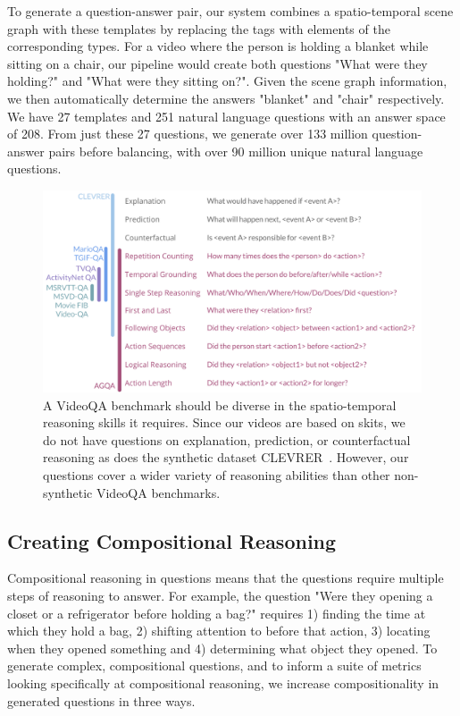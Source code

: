 \documentclass[10pt,twocolumn,letterpaper]{article}
\begin{document}
To generate a question-answer pair, our system combines a spatio-temporal scene graph with these templates by replacing the tags with elements of the corresponding types. For a video where the person is holding a blanket while sitting on a chair, our pipeline would create both questions "What were they holding?" and "What were they sitting on?". Given the scene graph information, we then automatically determine the answers "blanket" and "chair" respectively. We have 27 templates and 251 natural language questions with an answer space of 208. From just these 27 questions, we generate over 133 million question-answer pairs before balancing, with over 90 million unique natural language questions.

\begin{figure}[t]
    \centering
    \includegraphics[width=\columnwidth]{figures/questions.pdf}
    \caption{A VideoQA benchmark should be diverse in the spatio-temporal reasoning skills it requires. Since our videos are based on skits, we do not have questions on explanation, prediction, or counterfactual reasoning as does the synthetic dataset CLEVRER~\cite{yi2019clevrer}. However, our questions cover a wider variety of reasoning abilities than other non-synthetic VideoQA benchmarks.}
    \label{fig:questions}
\end{figure}

\subsection{Creating Compositional Reasoning}

Compositional reasoning in questions means that the questions require multiple steps of reasoning to answer. For example, the question "Were they opening a closet or a refrigerator before holding a bag?" requires 1) finding the time at which they hold a bag, 2) shifting attention to before that action, 3) locating when they opened something and 4) determining what object they opened. To generate complex, compositional questions, and to inform a suite of metrics looking specifically at compositional reasoning, we increase compositionality in generated questions in three ways.
\end{document}
